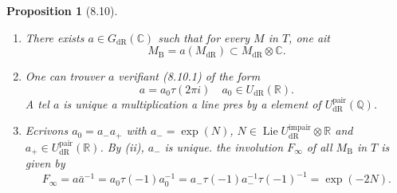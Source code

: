 \documentclass[12pt,a4paper]{article}
\theoremstyle{plain}
\newtheorem{proposition}[theorem]{Proposition}
\theoremstyle{definition}
\theoremstyle{remark}
\DeclareMathOperator{\Lie}{Lie}
\newcommand{\DR}{\mathrm{dR}}
\newcommand{\B}{\mathrm{B}}
\newcommand{\Q}{\mathbb{Q}}
\newcommand{\C}{\mathbb{C}}
\newcommand{\R}{\mathbb{R}}
\begin{document}
\begin{proposition}[8.10]\label{prop:8.10}
\begin{enumerate}[label=(\roman*)]
\item There exists $a \in G_\DR(\C)$ such that for every $M$ in $T$, one ait
\begin{equation*}\tag{8.10.1}
M_\B = a(M_\DR) \subset M_\DR \otimes \C.
\end{equation*}
\item One can trouver $a$ verifiant (8.10.1) of the form
\begin{equation*}\tag{8.10.2}
a = a_0 \tau(2\pi i) \quad a_0 \in U_\DR(\R).
\end{equation*}
A tel $a$ is unique a multiplication a line pres by a element of $U_\DR^{\mathrm{pair}}(\Q)$.

\item Ecrivons $a_0 = a_- a_+$ with $a_- = \exp(N)$, $N \in \Lie U_\DR^{\mathrm{impair}} \otimes \R$ and $a_+ \in U_\DR^{\mathrm{pair}}(\R)$. By (ii), $a_-$ is unique. the involution $F_\infty$ of all $M_\B$ in $T$ is given by
\begin{equation*}\tag{8.10.3}
F_\infty = a\bar{a}^{-1} = a_0 \tau(-1) a_0^{-1} = a_- \tau(-1) a_-^{-1} \tau(-1)^{-1} = \exp(-2N).
\end{equation*}
\end{enumerate}
\end{proposition}
\end{document}
